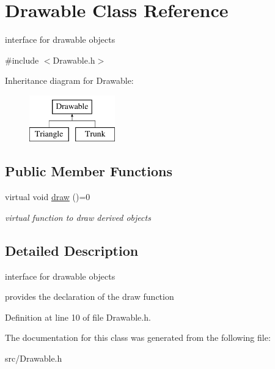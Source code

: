 \hypertarget{class_drawable}{}\section{Drawable Class Reference}
\label{class_drawable}


interface for drawable objects  




{\ttfamily \#include $<$Drawable.\+h$>$}

Inheritance diagram for Drawable\+:\begin{figure}[H]
\begin{center}
\leavevmode
\includegraphics[height=2.000000cm]{class_drawable}
\end{center}
\end{figure}
\subsection*{Public Member Functions}
\begin{DoxyCompactItemize}
\item 
\mbox{\label{class_drawable_aa37d7b328240d343134adcfe5e4dcd38}} 
virtual void \mbox{\hyperlink{class_drawable_aa37d7b328240d343134adcfe5e4dcd38}{draw}} ()=0
\begin{DoxyCompactList}\small\item\em virtual function to draw derived objects \end{DoxyCompactList}\end{DoxyCompactItemize}


\subsection{Detailed Description}
interface for drawable objects 

provides the declaration of the draw function 

Definition at line 10 of file Drawable.\+h.



The documentation for this class was generated from the following file\+:\begin{DoxyCompactItemize}
\item 
src/Drawable.\+h\end{DoxyCompactItemize}
